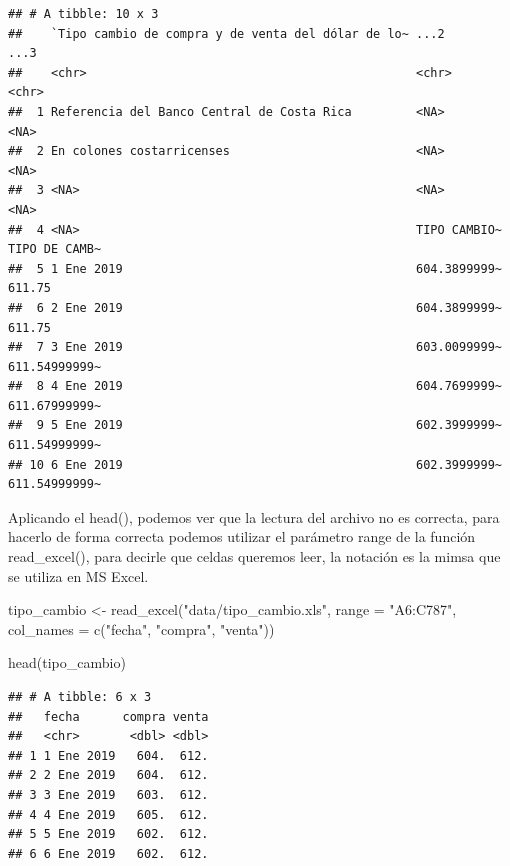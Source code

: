 \documentclass[
  12pt,
]{book}
\newenvironment{Shaded}{\begin{snugshade}}{\end{snugshade}}
\newcommand{\AttributeTok}[1]{\textcolor[rgb]{0.77,0.63,0.00}{#1}}
\newcommand{\FunctionTok}[1]{\textcolor[rgb]{0.00,0.00,0.00}{#1}}
\newcommand{\NormalTok}[1]{#1}
\newcommand{\OtherTok}[1]{\textcolor[rgb]{0.56,0.35,0.01}{#1}}
\newcommand{\StringTok}[1]{\textcolor[rgb]{0.31,0.60,0.02}{#1}}
\begin{document}
\begin{verbatim}
## # A tibble: 10 x 3
##    `Tipo cambio de compra y de venta del dólar de lo~ ...2         ...3         
##    <chr>                                              <chr>        <chr>        
##  1 Referencia del Banco Central de Costa Rica         <NA>         <NA>         
##  2 En colones costarricenses                          <NA>         <NA>         
##  3 <NA>                                               <NA>         <NA>         
##  4 <NA>                                               TIPO CAMBIO~ TIPO DE CAMB~
##  5 1 Ene 2019                                         604.3899999~ 611.75       
##  6 2 Ene 2019                                         604.3899999~ 611.75       
##  7 3 Ene 2019                                         603.0099999~ 611.54999999~
##  8 4 Ene 2019                                         604.7699999~ 611.67999999~
##  9 5 Ene 2019                                         602.3999999~ 611.54999999~
## 10 6 Ene 2019                                         602.3999999~ 611.54999999~
\end{verbatim}

Aplicando el head(), podemos ver que la lectura del archivo no es correcta, para hacerlo de forma correcta podemos utilizar el parámetro range de la función read\_excel(), para decirle que celdas queremos leer, la notación es la mimsa que se utiliza en MS Excel.

\begin{Shaded}
\begin{Highlighting}[]
\NormalTok{tipo\_cambio }\OtherTok{\textless{}{-}} \FunctionTok{read\_excel}\NormalTok{(}\StringTok{"data/tipo\_cambio.xls"}\NormalTok{, }\AttributeTok{range =} \StringTok{"A6:C787"}\NormalTok{, }\AttributeTok{col\_names =} \FunctionTok{c}\NormalTok{(}\StringTok{"fecha"}\NormalTok{, }\StringTok{"compra"}\NormalTok{, }\StringTok{"venta"}\NormalTok{))}

\FunctionTok{head}\NormalTok{(tipo\_cambio)}
\end{Highlighting}
\end{Shaded}

\begin{verbatim}
## # A tibble: 6 x 3
##   fecha      compra venta
##   <chr>       <dbl> <dbl>
## 1 1 Ene 2019   604.  612.
## 2 2 Ene 2019   604.  612.
## 3 3 Ene 2019   603.  612.
## 4 4 Ene 2019   605.  612.
## 5 5 Ene 2019   602.  612.
## 6 6 Ene 2019   602.  612.
\end{verbatim}
\end{document}
